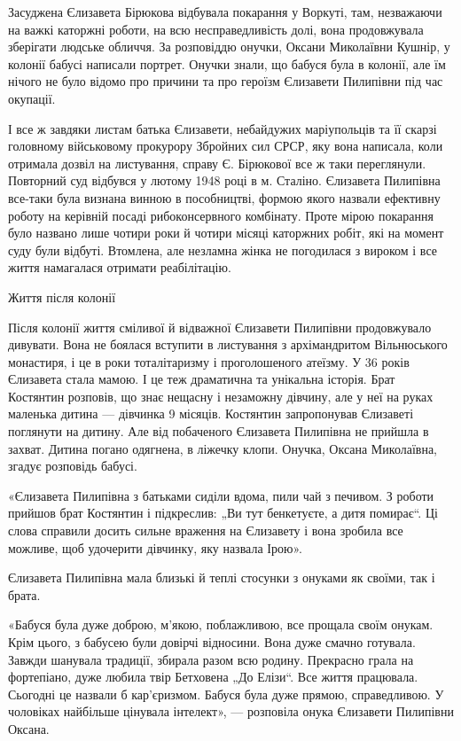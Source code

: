 Засуджена Єлизавета Бірюкова відбувала покарання у Воркуті, там, незважаючи на
важкі каторжні роботи, на всю несправедливість долі, вона продовжувала
зберігати людське обличчя. За розповіддю онучки, Оксани Миколаївни Кушнір, у
колонії бабусі написали портрет. Онучки знали, що бабуся була в колонії, але їм
нічого не було відомо про причини та про героїзм Єлизавети Пилипівни під час
окупації.

І все ж завдяки листам батька Єлизавети, небайдужих маріупольців та її скарзі
головному військовому прокурору Збройних сил СРСР, яку вона написала, коли
отримала дозвіл на листування, справу Є. Бірюкової все ж таки переглянули.
Повторний суд відбувся у лютому 1948 році в м. Сталіно. Єлизавета Пилипівна
все-таки була визнана винною в пособництві, формою якого назвали ефективну
роботу на керівній посаді рибоконсервного комбінату. Проте мірою покарання було
названо лише чотири роки й чотири місяці каторжних робіт, які на момент суду
були відбуті. Втомлена, але незламна жінка не погодилася з вироком і все життя
намагалася отримати реабілітацію.

Життя після колонії 

Після колонії життя сміливої й відважної Єлизавети Пилипівни продовжувало
дивувати. Вона не боялася вступити в листування з архімандритом Вільнюського
монастиря, і це в роки тоталітаризму і проголошеного атеїзму. У 36 років
Єлизавета стала мамою. І це теж драматична та унікальна історія. Брат Костянтин
розповів, що знає нещасну і незаможну дівчину, але у неї на руках маленька
дитина — дівчинка 9 місяців. Костянтин запропонував Єлизаветі поглянути на
дитину. Але від побаченого Єлизавета Пилипівна не прийшла в захват. Дитина
погано одягнена, в ліжечку клопи. Онучка, Оксана Миколаївна, згадує розповідь
бабусі.

«Єлизавета Пилипівна з батьками сиділи вдома, пили чай з печивом. З роботи
прийшов брат Костянтин і підкреслив: „Ви тут бенкетуєте, а дитя помирає“. Ці
слова справили досить сильне враження на Єлизавету і вона зробила все можливе,
щоб удочерити дівчинку, яку назвала Ірою».

Єлизавета Пилипівна мала близькі й теплі стосунки з онуками як своїми, так і
брата.

«Бабуся була дуже доброю, м'якою, поблажливою, все прощала своїм онукам. Крім
цього, з бабусею були довірчі відносини. Вона дуже смачно готувала. Завжди
шанувала традиції, збирала разом всю родину. Прекрасно грала на фортепіано,
дуже любила твір Бетховена „До Елізи“. Все життя працювала. Сьогодні це назвали
б кар'єризмом. Бабуся була дуже прямою, справедливою. У чоловіках найбільше
цінувала інтелект», — розповіла онука Єлизавети Пилипівни Оксана.

